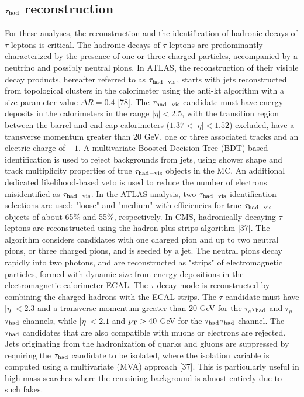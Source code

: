 \subsection{$\tau_{\rm had}$ reconstruction}
For these analyses, the reconstruction and the identification of hadronic decays of $\tau$ leptons is critical.
The hadronic decays of $\tau$ leptons are predominantly characterized by the presence of one or three charged particles, accompanied by a neutrino and possibly neutral pions. In ATLAS, the reconstruction of their visible decay products, hereafter referred to as $\tau_{\rm had-vis}$, starts with jets reconstructed from topological clusters in the calorimeter using the anti-kt algorithm with a size parameter value $\Delta R = 0.4$ [78]. The $\tau_{\rm had-vis}$ candidate must have energy deposits in the calorimeters in the range $|\eta| < 2.5$, with the transition region between the barrel and end-cap calorimeters ($1.37 < |\eta| < 1.52$) excluded, have a transverse momentum greater than 20 GeV, one or three associated tracks and an electric charge of $\pm1$. A multivariate Boosted Decision Tree (BDT) based identification is used to reject backgrounds from jets, using shower shape and track multiplicity properties of true $\tau_{\rm had-vis}$ objects in the MC. An additional dedicated likelihood-based veto is used to reduce the number of electrons misidentified as $\tau_{\rm had-vis}$. In the ATLAS analysis, two $\tau_{\rm had-vis}$ identification selections are used: "loose" and "medium" with efficiencies for true $\tau_{\rm had-vis}$ objects of about 65\% and 55\%, respectively. In CMS, hadronically decaying $\tau$ leptons are reconstructed using the hadron-plus-strips algorithm [37].
The algorithm considers candidates with one charged pion and up to two neutral pions, or
three charged pions, and is seeded by a jet. The neutral pions decay rapidly into two photons,
and are reconstructed as "strips" of electromagnetic particles, formed with dynamic size
from energy depositions in the electromagnetic calorimeter ECAL. 
The $\tau$ decay mode is reconstructed by combining the charged hadrons with the ECAL strips. 
The $\tau$ candidate must have $|\eta| < 2.3$ and a transverse momentum greater than 20 GeV for the $\tau_{e}$$\tau_{\rm had}$ and  $\tau_{\mu}$$\tau_{\rm had}$ channels, while $|\eta| < 2.1$ and $p_{\rm T}>40$ GeV for the  $\tau_{\rm had}$$\tau_{\rm had}$ channel. The $\tau_{\rm had}$ candidates that are also compatible with muons
or electrons are rejected. Jets originating from the hadronization of quarks and gluons are suppressed
by requiring the $\tau_{\rm had}$ candidate to be isolated, where the isolation variable is computed using
a multivariate (MVA) approach [37]. This is particularly useful in high mass searches where the remaining background is
almost entirely due to such fakes.

